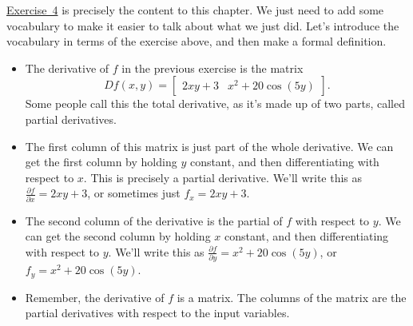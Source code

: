 \documentclass[10pt,]{book}
\theoremstyle{plain}
\theoremstyle{definition}
\theoremstyle{definition}
\theoremstyle{definition}
\theoremstyle{definition}
\theoremstyle{definition}
\numberwithin{equation}{section}
\newcommand{\amp}{&}
\begin{document}
\hyperref[unit6_content]{Exercise~4} is precisely the content to this chapter. We just need to add some vocabulary to make it easier to talk about what we just did. Let's introduce the vocabulary in terms of the exercise above, and then make a formal definition. \leavevmode%
\begin{itemize}[label=\textbullet]
\item{}The derivative of \(f\) in the previous exercise is the matrix%
\begin{equation*}
Df(x,y) = \begin{bmatrix}2xy+3\amp  
x^2+20\cos(5y)
\end{bmatrix} .
\end{equation*}
Some people call this the total derivative, as it's made up of two parts, called partial derivatives.%
\item{}The first column of this matrix is just part of the whole derivative. We can get the first column by holding \(y\) constant, and then differentiating with respect to \(x\). This is precisely a partial derivative.  We'll write this as \(\frac{\partial f}{\partial x} = 2xy+3\), or sometimes just \(f_x = 2xy+3\).%
\item{}The second column of the derivative is the partial of \(f\) with respect to \(y\). We can get the second column by holding \(x\) constant, and then differentiating with respect to \(y\). We'll write this as \(\frac{\partial f}{\partial y} = x^2+20\cos(5y)\), or \(f_y = x^2+20\cos(5y)\).%
\item{}Remember, the derivative of \(f\) is a matrix. The columns of the matrix are the partial derivatives with respect to the input variables.%
\end{itemize}
%
\end{document}
